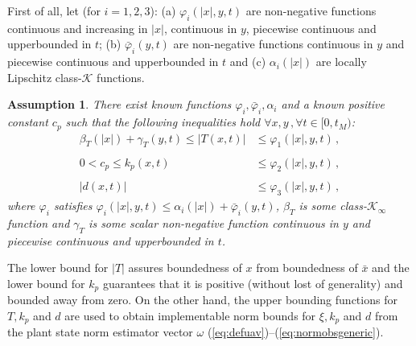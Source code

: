\documentclass{rncauth}
\newtheorem{assumption}{Assumption}
\begin{document}
First of all, let (for $i=1,2,3$): (a) $\varphi_i(|x|,y,t)$ are
non-negative functions continuous and increasing in $|x|$,
continuous in $y$, piecewise continuous and upperbounded in $t$;
(b) $\bar{\varphi}_i(y,t)$ are non-negative functions continuous
in $y$ and piecewise continuous and upperbounded in $t$ and (c)
$\alpha_i(|x|)$ are locally Lipschitz class-$\mathcal{K}$
functions.
%
%
\begin{assumption}\label{ATkpd} There exist {\em known} functions
$\varphi_i,\bar{\varphi}_i,\alpha_i$ and a {\em known} positive
constant $c_p$ such that the following inequalities hold $\forall
x,y\,, \forall t \in [0,t_M)$:
%
\begin{align}
\beta_T(|x|)+\gamma_T(y,t) \leq |T(x,t)| &\leq
\varphi_1(|x|,y,t)\,,\nonumber  \\ \nonumber \\
0<c_p \leq k_p(x,t) &\leq \varphi_2(|x|,y,t)\,, \nonumber \\ \nonumber \\
|d(x,t)| &\leq \varphi_3(|x|,y,t)\,,\nonumber
\end{align}
%
where $\varphi_i$ satisfies $\varphi_i(|x|,y,t) \leq
\alpha_i(|x|)+\bar{\varphi}_i(y,t)$, $\beta_T$ is some
class-$\mathcal{K}_\infty$ function and $\gamma_T$ is some scalar
non-negative function continuous in $y$ and piecewise continuous
and upperbounded in $t$.

\end{assumption}
%
The lower bound for $|T|$ assures boundedness of $x$ from
boundedness of $\bar{x}$ and the lower bound for $k_p$ guarantees
that it is positive (without lost of generality) and bounded away
from zero. On the other hand, the upper bounding functions for
$T,k_p$ and $d$ are used to obtain implementable norm bounds for
$\xi, k_p$ and $d$ from the plant state norm estimator vector
$\omega$ (\ref{eq:defuav})--(\ref{eq:normobsgeneric}).


\end{document}
